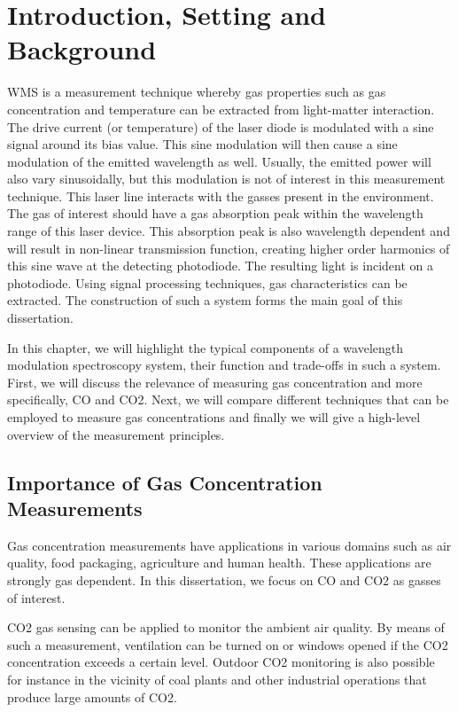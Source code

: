 \documentclass[\home/main.tex]{subfiles}
\begin{document}
\chapter{Introduction, Setting and Background}\label{background:setting-and-background}

\Acrfull{WMS} is a measurement technique where\-by gas properties such as gas concentration and temperature can be extracted from light-matter interaction. The drive current (or temperature) of the laser diode is modulated with a sine signal around its bias value. This sine modulation will then cause a sine modulation of the emitted wavelength as well. Usually, the emitted power will also vary sinusoidally, but this modulation is not of interest in this measurement technique. This laser line interacts with the gasses present in the environment. The gas of interest should have a gas absorption peak within the wavelength range of this laser device. This absorption peak is also wavelength dependent and will result in non-linear transmission function, creating higher order harmonics of this sine wave at the detecting photodiode. The resulting light is incident on a photodiode. Using signal processing techniques, gas characteristics can be extracted. The construction of such a system forms the main goal of this dissertation. 

In this chapter, we will highlight the typical components of a wavelength modulation spectroscopy system, their function and trade-offs in such a system. First, we will discuss the relevance of measuring gas concentration and more specifically, \acrfull{CO} and \acrfull{CO2}. Next, we will compare different techniques that can be employed to measure gas concentrations and finally we will give a high-level overview of the measurement principles.

\section{Importance of Gas Concentration Measurements}

  Gas concentration measurements have applications in various domains such as air quality, food packaging, agriculture and human health. These applications are strongly gas dependent. In this dissertation, we focus on \acrshort{CO} and \acrshort{CO2} as gasses of interest.
  
  \acrshort{CO2} gas sensing can be applied to monitor the ambient air quality. By means of such a measurement, ventilation can be turned on or windows opened if the \acrshort{CO2} concentration exceeds a certain level. Outdoor \acrshort{CO2} monitoring is also possible for instance in the vicinity of coal plants and other industrial operations that produce large amounts of \acrshort{CO2}. 
  
\end{document}
